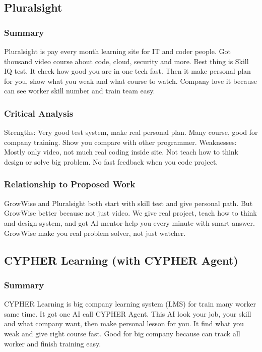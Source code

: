 \documentclass{FastFyp}
\begin{document}
\subsection{Pluralsight}

\subsubsection{Summary}
Pluralsight \cite{pluralsight2023} is pay every month learning site for IT and coder people. Got thousand video course about code, cloud, security and more. Best thing is Skill IQ test. It check how good you are in one tech fast. Then it make personal plan for you, show what you weak and what course to watch. Company love it because can see worker skill number and train team easy.

\subsubsection{Critical Analysis}
Strengths: Very good test system, make real personal plan. Many course, good for company training. Show you compare with other programmer.  
Weaknesses: Mostly only video, not much real coding inside site. Not teach how to think design or solve big problem. No fast feedback when you code project.

\subsubsection{Relationship to Proposed Work}
GrowWise and Pluralsight both start with skill test and give personal path. But GrowWise better because not just video. We give real project, teach how to think and design system, and got AI mentor help you every minute with smart answer. GrowWise make you real problem solver, not just watcher.


\subsection{CYPHER Learning (with CYPHER Agent)}

\subsubsection{Summary}
CYPHER Learning \cite{cypher2023} is big company learning system (LMS) for train many worker same time. It got one AI call CYPHER Agent. This AI look your job, your skill and what company want, then make personal lesson for you. It find what you weak and give right course fast. Good for big company because can track all worker and finish training easy.
\end{document}
